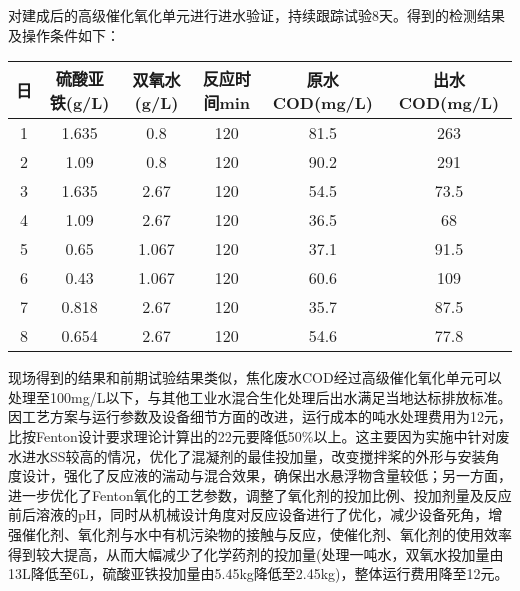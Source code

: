 对建成后的高级催化氧化单元进行进水验证，持续跟踪试验8天。得到的检测结果及操作条件如下：\par
\begin{center}
\label{tab6}
\begin{tabular}{| c | c | c | c | c | c |}
    \hline
    日 & 硫酸亚铁(g/L) & 双氧水(g/L) & 反应时间min & 原水COD(mg/L) & 出水COD(mg/L)\\ \hline 
    1 & 1.635 & 0.8 & 120 & 81.5 & 263\\ \hline 
    2 & 1.09 & 0.8 & 120 & 90.2 & 291\\ \hline 
    3 & 1.635 & 2.67 & 120 & 54.5 & 73.5\\ \hline 
    4 & 1.09 & 2.67 & 120 & 36.5 & 68\\ \hline 
    5 & 0.65 & 1.067 & 120 & 37.1 & 91.5\\ \hline 
    6 & 0.43 & 1.067 & 120 & 60.6 & 109\\ \hline 
    7 & 0.818 & 2.67 & 120 & 35.7 & 87.5\\ \hline 
    8 & 0.654 & 2.67 & 120 & 54.6 & 77.8\\ \hline     
\end{tabular}
\end{center}
\setlength{\parindent}{2em}
\par
现场得到的结果和前期试验结果类似，焦化废水COD经过高级催化氧化单元可以处理至100mg/L以下，与其他工业水混合生化处理后出水满足当地达标排放标准。因工艺方案与运行参数及设备细节方面的改进，运行成本的吨水处理费用为12元，比按Fenton设计要求理论计算出的22元要降低50\%以上。这主要因为实施中针对废水进水SS较高的情况，优化了混凝剂的最佳投加量，改变搅拌桨的外形与安装角度设计，强化了反应液的湍动与混合效果，确保出水悬浮物含量较低；另一方面，进一步优化了Fenton氧化的工艺参数，调整了氧化剂的投加比例、投加剂量及反应前后溶液的pH，同时从机械设计角度对反应设备进行了优化，减少设备死角，增强催化剂、氧化剂与水中有机污染物的接触与反应，使催化剂、氧化剂的使用效率得到较大提高，从而大幅减少了化学药剂的投加量(处理一吨水，双氧水投加量由13L降低至6L，硫酸亚铁投加量由5.45kg降低至2.45kg)，整体运行费用降至12元。\par

